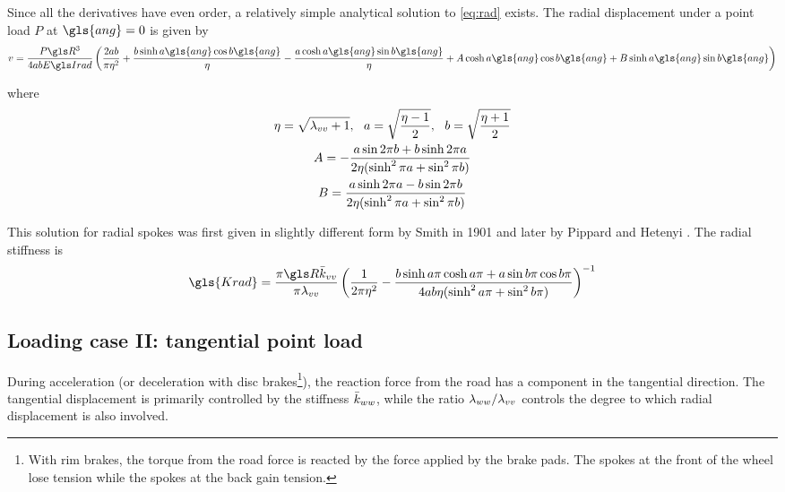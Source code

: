 \documentclass[\rootdir/thesis.tex]{subfiles}
\begin{document}
Since all the derivatives have even order, a relatively simple analytical solution to \eqref{eq:rad} exists. The radial displacement under a point load $P$ at $\gls{ang}=0$ is given by
\begin{equation}
\label{eq:rad_soln}
v = \frac{P\R^3}{4ab\EIr} \left( \frac{2ab}{\pi\eta^2} + \frac{b\sinh{a\gls{ang}}\cos{b\gls{ang}}}{\eta} 
                               -\frac{a\cosh{a\gls{ang}}\sin{b\gls{ang}}}{\eta}
                               +A\cosh{a\gls{ang}}\cos{b\gls{ang}} + B\sinh{a\gls{ang}}\sin{b\gls{ang}}\right)
\end{equation}

where
\begin{gather*}
\eta=\sqrt{\lambda_{vv} + 1}, \,\,\,\, a=\sqrt{\frac{\eta-1}{2}}, \,\,\,\, b=\sqrt{\frac{\eta+1}{2}}\\
A = -\frac{a\sin{2\pi b} + b\sinh{2\pi a}}{2\eta(\sinh^2{\pi a} + \sin^2{\pi b})}\\
B =  \frac{a\sinh{2\pi a} - b\sin{2\pi b}}{2\eta(\sinh^2{\pi a} + \sin^2{\pi b})}
\end{gather*}

This solution for radial spokes was first given in slightly different form by Smith \cite{Smith1901} in 1901 and later by Pippard \cite{Pippard1931} and Hetenyi \cite{Hetenyi1946}. The radial stiffness is
\begin{equation}
\label{eq:Krad}
\gls{Krad} =
    \frac{\pi\R\kvv}{\pi\lr_{vv}} \left(\frac{1}{2\pi\eta^2}
                                        -\frac{b\sinh{a\pi}\cosh{a\pi} + a\sin{b\pi}\cos{b\pi}}
                                              {4ab\eta (\sinh^2{a\pi} + \sin^2{b\pi})} \right)^{-1}
\end{equation}

\subsection{Loading case II: tangential point load}

During acceleration (or deceleration with disc brakes\footnote{With rim brakes, the torque from the road force is reacted by the force applied by the brake pads. The spokes at the front of the wheel lose tension while the spokes at the back gain tension.}), the reaction force from the road has a component in the tangential direction. The tangential displacement is primarily controlled by the stiffness $\bar{k}_{ww}$, while the ratio $\lambda_{ww}/\lambda_{vv}$ controls the degree to which radial displacement is also involved.
\end{document}
